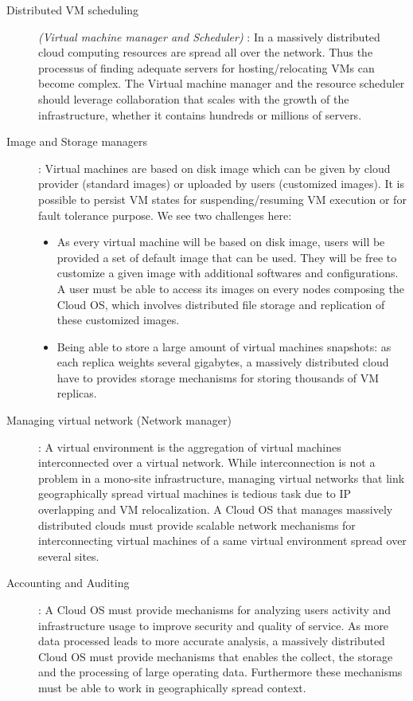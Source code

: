 \begin{description}

	\item [Distributed VM scheduling] \textit{(Virtual machine manager and 
	Scheduler)} : In a massively distributed cloud computing resources are 
	spread all over the network. Thus the processus of finding adequate 
	servers for hosting/relocating VMs can become complex. The Virtual
	machine manager and the resource scheduler should leverage collaboration 
	that scales with the growth of the infrastructure, whether it contains 
	hundreds or millions of servers.

	\item [Image and Storage managers] : Virtual machines are based on disk
	image which can be given by cloud provider (standard images) or uploaded
	by users (customized images). It is possible to persist VM states for
	suspending/resuming VM execution or for fault tolerance purpose. We see two 
	challenges here:

	\begin{itemize}

		\item As every virtual machine will be based on disk image, users
		will be provided a set of default image that can be used. They will
		be free to customize a given image with additional softwares and
		configurations. A user must be able to access its images on every
		nodes composing the Cloud OS, which involves distributed file 
		storage and replication of these customized images.

		\item Being able to store a large amount of virtual machines 
		snapshots: as each replica weights several gigabytes, a massively 
		distributed cloud have to provides storage mechanisms for storing 
		thousands of VM replicas.

	\end{itemize}

	\item [Managing virtual network (Network manager)] : A virtual 
	environment is the aggregation of virtual machines interconnected over
	a virtual network. While interconnection is not a problem in a mono-site
	infrastructure, managing virtual networks that link geographically spread
	virtual machines is tedious task due to IP overlapping and VM 
	relocalization. A Cloud OS that manages massively distributed clouds must 
	provide scalable network mechanisms for interconnecting virtual machines of 
	a same virtual environment spread over several sites.

	\item [Accounting and Auditing] : A Cloud OS must provide mechanisms for
	analyzing users activity and infrastructure usage to improve security and 
	quality of service. As more data processed leads to more accurate analysis, 
	a massively distributed Cloud OS must provide mechanisms that enables the
	collect, the storage and the processing of large operating data. Furthermore
	these mechanisms must be able to work in geographically spread context.

\end{description}



